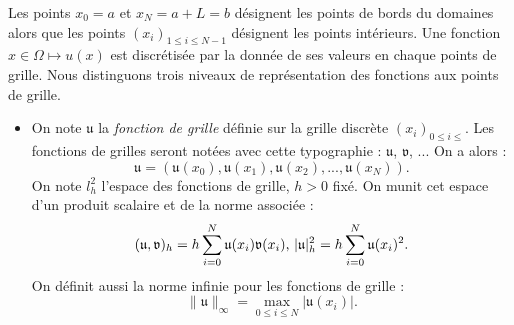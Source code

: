 Les points $x_0=a$ et $x_N = a + L = b$ désignent les points de bords du domaines alors que les points $(x_i)_{1 \leq i \leq N-1}$ désignent les points intérieurs. Une fonction $x \in \Omega \mapsto u(x)$ est discrétisée par la donnée de ses valeurs en chaque points de grille.
Nous distinguons trois niveaux de représentation des fonctions aux points de grille.
\begin{itemize}
\item On note $\mathfrak{u}$ la \textit{fonction de grille} définie sur la grille discrète $(x_i)_{0 \leq i \leq}$. Les fonctions de grilles seront notées avec cette typographie : $\mathfrak{u}$, $\mathfrak{v}$, ... 
On a alors :
\begin{equation}
\mathfrak{u} = (\mathfrak{u}(x_0), \mathfrak{u}(x_1), \mathfrak{u}(x_2), ... , \mathfrak{u}(x_N)).
\end{equation}
On note $l^2_h$ l'espace des fonctions de grille, $h>0$ fixé.
On munit cet espace d'un produit scalaire et de la norme associée :
\begin{equation}
(\mathfrak{u},\mathfrak{v})_h = h \displaystyle\sum\limits_{i=0}^N \mathfrak{u}(x_i) \mathfrak{v}(x_i) \text{,  } |\mathfrak{u}|_h^2 = h \displaystyle\sum\limits_{i=0}^N \mathfrak{u}(x_i)^2.
\end{equation}
On définit aussi la norme infinie pour les fonctions de grille :
\begin{equation}
\| \mathfrak{u} \|_{\infty} = \max_{0\leq i \leq N} |\mathfrak{u}(x_i)|.
\end{equation}


\end{itemize}

